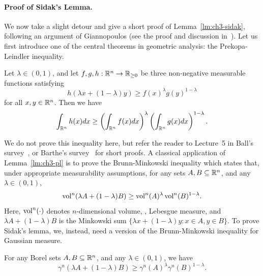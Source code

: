 \paragraph{Proof of Sidak's Lemma.} We now take a slight detour and give a short proof of
Lemma~\ref{lm:ch3-sidak}, following an argument of Giannopoulos (see
the proof and discussion in~\cite{SzW99}). Let us first introduce one of the central
theorems in geometric analysis: the Prekopa-Leindler inequality.

\begin{lemma}\label{lm:ch3-pl}
  Let \(\lambda \in (0,1)\), and let \(f,g,h:\mathbb{R}^n \to \mathbb{R}_{\ge 0}\) be
  three non-negative measurable functions satisfying
  \begin{equation}\label{eq:ch3-pl-ass}
    h(\lambda x + (1-\lambda)y) \ge f(x)^\lambda g(y)^{1-\lambda}
  \end{equation}
  for all \(x,y \in \mathbb{R}^n\). Then we have
  \[
    \int_{\mathbb{R}^n} h(x) dx \ge \left(\int_{\mathbb{R}^n} f(x) dx\right)^\lambda\left(\int_{\mathbb{R}^n} g(x) dx\right)^{1-\lambda}.
  \]
\end{lemma}
We do not prove this inequality here, but refer the reader to Lecture~5 in Ball's
survey~\cite{Ball-modern}, or Barthe's survey~\cite{Barthe06} for short proofs. A classical
application of Lemma~\ref{lm:ch3-pl} is to prove the Brunn-Minkowski
inequality which states that, under
appropriate measurability assumptions, for any sets \(A, B \subseteq
\mathbb{R}^n\), and any \(\lambda \in (0,1)\),
\begin{equation}\label{eq:ch3-bw}
  \operatorname{vol}^n(\lambda A + (1-\lambda)B) \ge \operatorname{vol}^n(A)^\lambda\operatorname{vol}^n(B)^{1-\lambda}.
\end{equation}
Here, \(\operatorname{vol}^n(\cdot)\) denotes \(n\)-dimensional volume, \ie,
Lebesgue measure, and \(\lambda A + (1-\lambda)B\) is the Minkowski
sum \(\{\lambda x + (1-\lambda)y: x \in A, y \in B\}\).
To prove Sidak's lemma, we, instead, need a version of the
Brunn-Minkowski inequality for Gaussian measure.
\begin{lemma}\label{lm:ch3-bm-gauss}
  For any Borel sets \(A,B \subseteq \mathbb{R}^n\), and any \(\lambda \in
  (0,1)\), we have
  \[
    \gamma^n(\lambda A + (1-\lambda)B) \ge \gamma^n(A)^\lambda\gamma^n(B)^{1-\lambda}.
  \]
\end{lemma}
